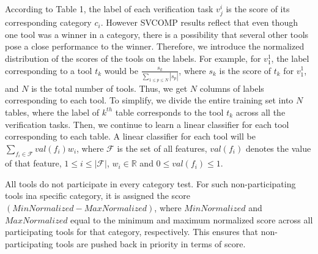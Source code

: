 According to Table 1, the label of each verification task $v^i_j$ is the score of its corresponding category $c_i$. However SVCOMP results reflect that even though one tool was a winner in a category, there is a possibility that several other tools pose a close performance to the winner. Therefore, we introduce the normalized distribution of the scores of the tools on the labels. For example, for $v^1_1$, the label corresponding to a tool $t_k$ would be $\frac{s_k}{\sum \limits_{1 \leq p \leq N} |s_p|}$, where $s_k$ is the score of $t_k$ for $v^1_1$, and $N$ is the total number of tools. Thus, we get $N$ columns of labels corresponding to each tool. To simplify, we divide the entire training set into $N$ tables, where the label of $k^{th}$ table corresponds to the tool $t_k$ across all the verification tasks. Then, we continue to learn a linear classifier for each tool corresponding to each table. A linear classifier for each tool will be $\sum \limits_{f_i \in \mathcal{F}} val(f_i)w_i$, where $\mathcal{F}$ is the set of all features, $val(f_i)$ denotes the value of that feature, $1 \leq i \leq |\mathcal{F}|$, $w_i \in \mathbb{R}$ and $0 \leq val(f_i) \leq 1$.

All tools do not participate in every category test. For such non-participating tools ina specific category, it is assigned the score $(MinNormalized - MaxNormalized)$, where $MinNormalized$ and $MaxNormalized$ equal to the minimum and maximum normalized score across all participating tools for that category, respectively. This ensures that non-participating tools are pushed back in priority in terms of score.